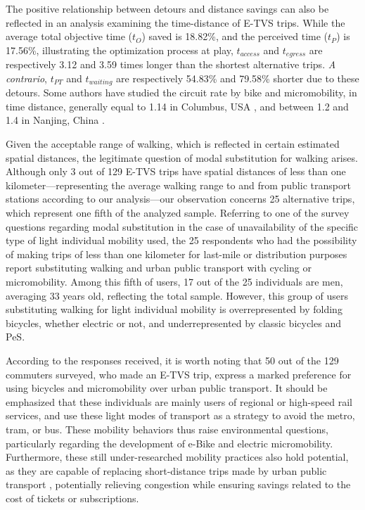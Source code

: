 \begin{refsegment}
The positive relationship between detours and distance savings can also be reflected in an analysis examining the time-distance of \acrshort{E-TVS} trips. While the average total objective time (\(t_{O}\)) saved is 18.82\%, and the perceived time (\(t_{P}\)) is 17.56\%, illustrating the optimization process at play, \(t_{access}\) and \(t_{egress}\) are respectively 3.12 and 3.59 times longer than the shortest alternative trips. \textsl{A contrario}, \(t_{PT}\) and \(t_{waiting}\) are respectively 54.83\% and 79.58\% shorter due to these detours. Some authors have studied the circuit rate by bike and micromobility, in time distance, generally equal to 1.14 in Columbus, USA \textcolor{blue}{\autocite[195]{park_why_2019}}, and between 1.2 and 1.4 in Nanjing, China \textcolor{blue}{\autocite[10]{li_measuring_2022}}.%

Given the acceptable range of walking, which is reflected in certain estimated spatial distances, the legitimate question of modal substitution for walking arises. Although only 3 out of 129 \acrshort{E-TVS} trips have spatial distances of less than one kilometer—representing the average walking range to and from public transport stations according to our analysis—our observation concerns 25 alternative trips, which represent one fifth of the analyzed sample. Referring to one of the survey questions regarding modal substitution in the case of unavailability of the specific type of light individual mobility used, the 25 respondents who had the possibility of making trips of less than one kilometer for last-mile or distribution purposes report substituting walking and urban public transport with cycling or micromobility. Among this fifth of users, 17 out of the 25 individuals are men, averaging 33 years old, reflecting the total sample. However, this group of users substituting walking for light individual mobility is overrepresented by folding bicycles, whether electric or not, and underrepresented by classic bicycles and \acrshort{PeS}.%

According to the responses received, it is worth noting that 50 out of the 129 commuters surveyed, who made an \acrshort{E-TVS} trip, express a marked preference for using bicycles and micromobility over urban public transport. It should be emphasized that these individuals are mainly users of regional or high-speed rail services, and use these light modes of transport as a strategy to avoid the metro, tram, or bus. These mobility behaviors thus raise environmental questions, particularly regarding the development of \acrfull{e-Bike} and electric micromobility. Furthermore, these still under-researched mobility practices also hold potential, as they are capable of replacing short-distance trips made by urban public transport \textcolor{blue}{\autocite[328]{sun_can_2017}}, potentially relieving congestion while ensuring savings related to the cost of tickets or subscriptions.%


\end{refsegment}
